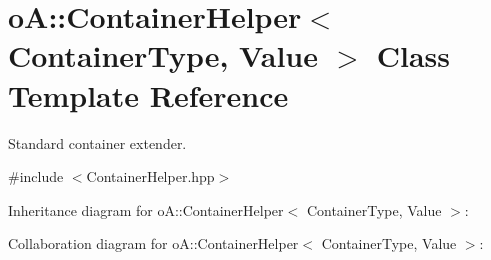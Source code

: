 \hypertarget{classo_a_1_1_container_helper}{}\section{oA\+:\+:Container\+Helper$<$ Container\+Type, Value $>$ Class Template Reference}
\label{classo_a_1_1_container_helper}


Standard container extender.  




{\ttfamily \#include $<$Container\+Helper.\+hpp$>$}



Inheritance diagram for oA\+:\+:Container\+Helper$<$ Container\+Type, Value $>$\+:


Collaboration diagram for oA\+:\+:Container\+Helper$<$ Container\+Type, Value $>$\+:
